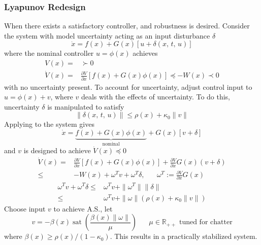 \documentclass[twocolumn]{article}    %
\begin{document}
\subsubsection*{Lyapunov Redesign}
When there exists a satisfactory controller, and robustness is desired. Consider the system with model uncertainty acting as an input disturbance \(\delta\)
\begin{equation*}
    \dot{x} = f(x) + G(x) \left[u+ \delta(x,\,t,\,u)\right]
\end{equation*}
where the nominal controller \(u = \phi(x)\) achieves
\begin{align*}
    V(x) =& \succ0 \\
    \dot{V}(x) =& \frac{\partial  V}{\partial x}\left[ f(x) + G(x)\phi(x) \right] \preceq -W(x) \prec 0
\end{align*}
with no uncertainty present. To account for uncertainty, adjust control input to \(u = \phi(x) + v\), where \(v\) deals with the effects of uncertainty. To do this, uncertainty \(\delta\) is manipulated to satisfy 
\begin{equation*}
    \|\delta(x,\, t,\, u) \| \leq \rho(x) + \kappa_0\|v\|
\end{equation*}
Applying to the system gives
\begin{equation*}
    \dot{x} = \underbrace{f(x) + G(x)\phi(x)}_{\text{nominal}}  + G(x)\left[ v+ \delta\right]
\end{equation*}
and \(v\) is designed to achieve \(\dot{V}(x)\preceq0\)
\begin{align*}
    \dot{V}(x) =& \frac{\partial V}{\partial x} \left[f(x) + G(x)\phi(x) \right] + \frac{\partial V}{\partial x}G(x)(v+\delta)\\
    \leq& -W(x) + \omega^Tv + \omega^T\delta, \hspace{20pt} \omega^T:= \frac{\partial V}{\partial x}G(x)
\end{align*}
\begin{align*}
    \omega^Tv + \omega^T\delta \leq& \omega^Tv + \|\omega^T\| \|\delta\|\\
    \leq& \omega^Tv + \|\omega\| (\rho(x) + \kappa_0\|v\|)
\end{align*}
Choose input \(v\) to achieve A.S., let
\begin{equation*}
    v = -\beta(x) \operatorname{sat}\left( \frac{\beta(x) \|\omega\|}{\mu}\right) \hspace{20pt} \mu \in \mathds{R}_{++} \text{ tuned for chatter}
\end{equation*}
where \(\beta(x) \geq \rho(x)/(1-\kappa_0)\). This results in a practically stabilized system.
\end{document}
